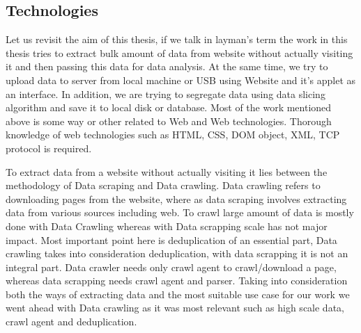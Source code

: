 \documentclass[article,type=msc,colorback,accentcolor=tud9c,twoside,11pt]{tudthesis}
\begin{document}
\subsection{Technologies}
Let us revisit the aim of this thesis, if we talk in layman's term the work in this thesis tries to extract bulk amount of data from website without actually visiting it and then passing this data for data analysis. At the same time, we try to upload data to server from local machine or USB using Website and it's applet as an interface. In addition, we are trying to segregate data using data slicing algorithm and save it to local disk or database. Most of the work mentioned above is some way or other related to Web and Web technologies. Thorough knowledge of web technologies such as HTML, CSS, DOM object, XML, TCP protocol is required.

To extract data from a website without actually visiting it lies between the methodology of Data scraping and Data crawling. Data crawling refers to downloading pages from the website, where as data scraping involves extracting data from various sources including web. To crawl  large amount of data is mostly done with Data Crawling whereas with Data scrapping scale has not major impact. Most important point here is deduplication of an essential part, Data crawling takes into consideration deduplication, with data scrapping it is not an integral part. Data crawler needs only crawl agent to crawl/download a page, whereas data scrapping needs crawl agent and parser. Taking into consideration both the ways of extracting data and the most suitable use case for our work we went ahead with Data crawling as it was most relevant such as high scale data, crawl agent and deduplication.
\end{document}
